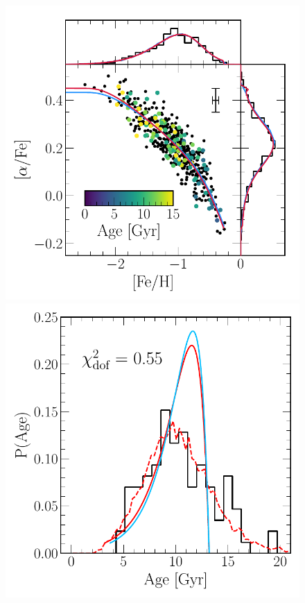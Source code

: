 \documentclass[foo.tex]{subfiles}
\begin{document}
\begin{figure}
\centering
\includegraphics[scale = 0.5]{fiducial_mock_afe_feh.pdf}
\includegraphics[scale = 0.42]{fiducial_mock_agedist.pdf}

\end{figure}
\end{document}

